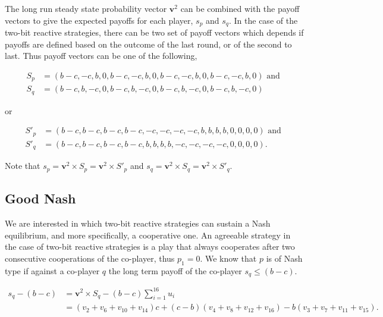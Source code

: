 \documentclass{article}
\theoremstyle{definition}
\begin{document}
The long run steady state probability vector \(\mathbf{v}^{2}\) can be combined
with the payoff vectors to give the expected payoffs for each player, \(s_{p}\)
and \(s_{q}\). In the case of the two-bit reactive strategies, there can be two
set of payoff vectors which depends if payoffs are defined based on the outcome
of the last round, or of the second to last. Thus payoff vectors can be
one of the following,

\begin{align}\label{eq:last_round_two_bits}
  S_{p} & =  (b - c, -c, b, 0, b - c, -c, b, 0, b - c, -c, b, 0, b - c, -c, b, 0)  \textrm{ and } \nonumber \\
  S_{q} & = (b - c, b, -c, 0, b - c, b, -c, 0, b - c, b, -c, 0, b - c, b, -c, 0)
\end{align}

or

\begin{align}\label{eq:second_to_last_round_two_bits}
  S'_{p} & = (b - c, b - c, b - c, b - c, -c, -c, -c, -c, b, b, b, b, 0, 0, 0, 0) \textrm{ and } \nonumber \\
  S'_{q} & = (b - c, b - c, b - c, b - c, b, b, b, b, -c, -c, -c, -c, 0, 0, 0, 0).
\end{align}

Note that \(s_{p} = \mathbf{v}^{2} \times S_{p} = \mathbf{v}^{2} \times S'_{p}\)
and \(s_{q} = \mathbf{v}^{2} \times S_{q} = \mathbf{v}^{2} \times S'_{q}\).

\subsection{Good Nash}

We are interested in which two-bit reactive strategies can sustain a Nash
equilibrium, and more specifically, a cooperative one. An agreeable strategy in
the case of two-bit reactive strategies is a play that always cooperates after
two consecutive cooperations of the co-player, thus \(p_1 = 0\). We know that
\(p\) is of Nash type if against a co-player \(q\) the long term payoff of the
co-player \(s_{q} \leq (b - c)\).

\begin{align}\label{eq:nash_condition_last_round}
  s_{q} - (b - c) & = \mathbf{v}^{2} \times S_{q} - (b - c) \sum_{i=1}^{16} u_{i}\\ \nonumber
  & = (v_{2} + v_{6} + v_{10} + v_{14}) c + (c - b) (v_{4} + v_{8} + v_{12} + v_{16}) - b (v_{3} + v_{7} + v_{11} + v_{15}) .
\end{align}
\end{document}
